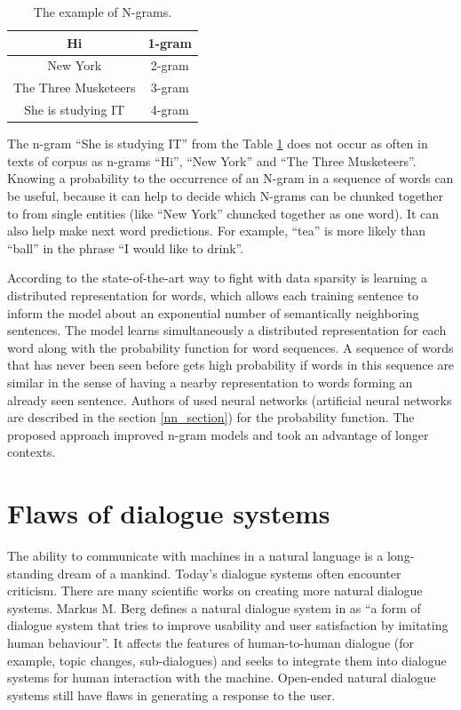 \begin{table}[ht]
  \centering
   \begin{tabular}{|c|c|} 
   \hline
    Hi & 1-gram \\
   \hline
    New York & 2-gram \\
   \hline
   The Three Musketeers & 3-gram \\
   \hline
   She is studying IT & 4-gram \\
   \hline
   \end{tabular}
   \caption{The example of N-grams.}
  \label{tab:n_gram}
\end{table}

The n-gram ``She is studying IT'' from the Table \ref{tab:n_gram} does not occur as often in texts of corpus as n-grams ``Hi'', ``New York'' and ``The Three Musketeers''. Knowing a probability to the occurrence of an N-gram in a sequence of words can be useful, because it can help to decide which N-grams can be chunked together to from single entities (like ``New York'' chuncked together as one word). It can also help make next word predictions. For example, ``tea'' is more likely than ``ball'' in the phrase ``I would like to drink''.


According to \cite{bengio2003neural} the state-of-the-art way to fight with data sparsity is learning a distributed representation for words, which allows each training sentence to inform the model about an exponential number of semantically neighboring sentences. The model learns simultaneously a distributed representation for each word along with the probability function for word sequences. A sequence of words that has never been seen before gets high probability if words in this sequence are similar in the sense of having a nearby representation to words forming an already seen sentence. Authors of \cite{bengio2003neural} used neural networks (artificial neural networks are described in the section \ref{nn_section}) for the probability function. The proposed approach improved n-gram models and took an advantage of longer contexts.


\section{Flaws of dialogue systems}\label{nlg_ds_problems}
The ability to communicate with machines in a natural language is a long-standing dream of a mankind. Today's dialogue systems often encounter criticism. There are many scientific works on creating more natural dialogue systems. Markus M. Berg defines a natural dialogue system in \cite{berg2014modelling} as ``a form of dialogue system that tries to improve usability and user satisfaction by imitating human behaviour''. It affects the features of human-to-human dialogue (for example, topic changes, sub-dialogues) and seeks to integrate them into dialogue systems for human interaction with the machine. Open-ended natural dialogue systems still have flaws in generating a response to the user.

